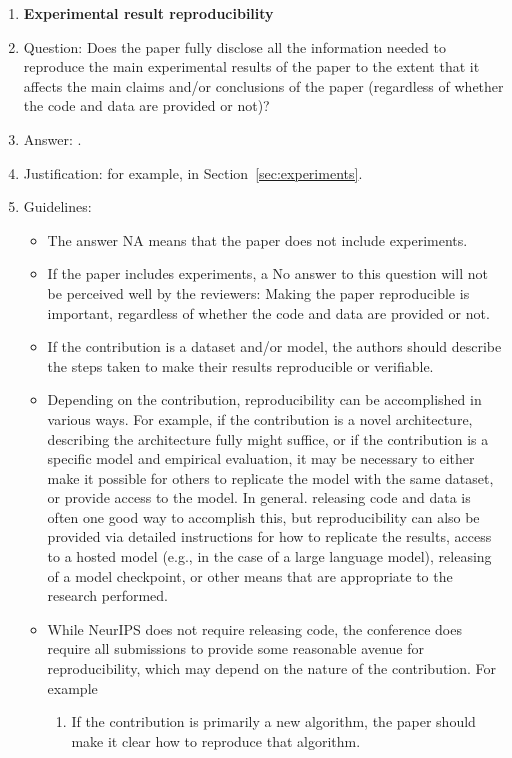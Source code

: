 \documentclass{article}
\begin{document}
{\begin{enumerate}
    \item {\bf Experimental result reproducibility}
    \item[] Question: Does the paper fully disclose all the information needed to reproduce the main experimental results of the paper to the extent that it affects the main claims and/or conclusions of the paper (regardless of whether the code and data are provided or not)?
    \item[] Answer: \answerYes{}.
    \item[] Justification: for example, in Section~\ref{sec:experiments}.
    \item[] Guidelines:
    \begin{itemize}
        \item The answer NA means that the paper does not include experiments.
        \item If the paper includes experiments, a No answer to this question will not be perceived well by the reviewers: Making the paper reproducible is important, regardless of whether the code and data are provided or not.
        \item If the contribution is a dataset and/or model, the authors should describe the steps taken to make their results reproducible or verifiable. 
        \item Depending on the contribution, reproducibility can be accomplished in various ways. For example, if the contribution is a novel architecture, describing the architecture fully might suffice, or if the contribution is a specific model and empirical evaluation, it may be necessary to either make it possible for others to replicate the model with the same dataset, or provide access to the model. In general. releasing code and data is often one good way to accomplish this, but reproducibility can also be provided via detailed instructions for how to replicate the results, access to a hosted model (e.g., in the case of a large language model), releasing of a model checkpoint, or other means that are appropriate to the research performed.
        \item While NeurIPS does not require releasing code, the conference does require all submissions to provide some reasonable avenue for reproducibility, which may depend on the nature of the contribution. For example
        \begin{enumerate}
            \item If the contribution is primarily a new algorithm, the paper should make it clear how to reproduce that algorithm.

\end{enumerate}
\end{itemize}
\end{enumerate}}
\end{document}
